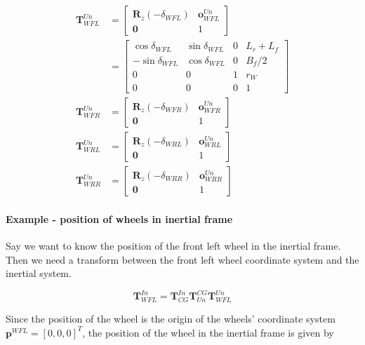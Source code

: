 \begin{align}
  \mathbf{T}_{WFL}^{Un} &= 
  \begin{bmatrix}
    \mathbf{R}_z(-\delta_{WFL}) & \mathbf{o}_{WFL}^{Un} \\
    \mathbf{0} & 1
  \end{bmatrix} \\
  &=
  \begin{bmatrix}
    \cos{\delta_{WFL}} & \sin{\delta_{WFL}} & 0 & L_r + L_f \\
    -\sin{\delta_{WFL}} & \cos{\delta_{WFL}} & 0 & B_f/2 \\
    0 & 0 & 1 & r_W \\
    0 & 0 & 0 & 1
  \end{bmatrix} \\
  \mathbf{T}_{WFR}^{Un} &= 
  \begin{bmatrix}
    \mathbf{R}_z(-\delta_{WFR}) & \mathbf{o}_{WFR}^{Un} \\
    \mathbf{0} & 1
  \end{bmatrix} \\
  \mathbf{T}_{WRL}^{Un} &= 
  \begin{bmatrix}
    \mathbf{R}_z(-\delta_{WRL}) & \mathbf{o}_{WRL}^{Un} \\
    \mathbf{0} & 1
  \end{bmatrix} \\
  \mathbf{T}_{WRR}^{Un} &= 
  \begin{bmatrix}
    \mathbf{R}_z(-\delta_{WRR}) & \mathbf{o}_{WRR}^{Un} \\
    \mathbf{0} & 1
  \end{bmatrix}
\end{align}


\paragraph{Example - position of wheels in inertial frame}

Say we want to know the position of the front left wheel in the inertial frame. Then we need a transform between the front left wheel coordinate system and the inertial system. 

\begin{equation}
  \mathbf{T}_{WFL}^{In} =
    \mathbf{T}_{CG}^{In} \mathbf{T}_{Un}^{CG} \mathbf{T}_{WFL}^{Un}
\end{equation}

Since the position of the wheel is the origin of the wheels' coordinate system $\mathbf{p}^{WFL} = [0, 0, 0]^T$, the position of the wheel in the inertial frame is given by

